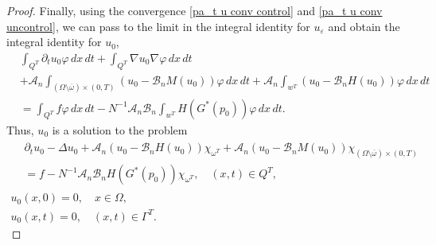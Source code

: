 \documentclass[10pt,a4paper]{amsart}
\numberwithin{equation}{section}
\begin{document}
\begin{proof}
Finally, using the convergence \eqref{pa_t u conv control} and
\eqref{pa_t u conv uncontrol}, we can pass to the limit in the integral 
identity for $u_{\varepsilon }$ and obtain the integral identity for $u_0$,
\begin{equation}
\begin{aligned}
&\int _{Q^{T}}\partial _{t}u_0\varphi \,dx\,dt+\int
_{Q^{T}}\nabla u_0\nabla \varphi \,dx\,dt    \\
&+\mathcal{A}_n\int _{(\Omega \setminus \overline{\omega })\times
(0,T)}(u_0-\mathcal{B}_nM(u_0))\varphi \,dx\,dt+\mathcal{A}_n\int
_{w^{T}}(u_0-\mathcal{B}_nH(u_0))\varphi\,dx\,dt    \\
&=\int _{Q^{T}}f\varphi \,dx\,dt-N^{-1}\mathcal{A}_n\mathcal{B}%
_n\int _{w^{T}}H(G^{\ast }(p_0))\varphi \,dx\,dt.
\end{aligned} \label{u_0 int ident}
\end{equation}
Thus, $u_0$ is a solution to the  problem
\begin{gather*}
\begin{aligned}
&\partial _{t}u_0-\Delta u_0+\mathcal{A}_n(u_0-\mathcal{B}%
_nH(u_0))\chi _{\omega ^{T}}
+\mathcal{A}_n(u_0-\mathcal{B}_nM(u_0))\chi _{(\Omega \setminus
\overline{\omega })\times (0,T)} \\
&=f-N^{-1}\mathcal{A}_n\mathcal{B}_nH(G^{\ast }(p_0))
\chi _{\omega ^{T}}, \quad (x,t)\in Q^{T},
\end{aligned} \\
u_0(x,0)=0, \quad x\in \Omega , \\
u_0(x,t)=0, \quad (x,t)\in \Gamma ^{T}.
\end{gather*}


\end{proof}
\end{document}
